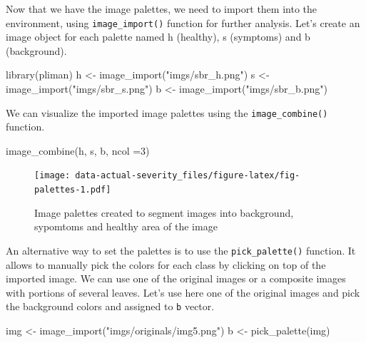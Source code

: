 \documentclass[
  letterpaper,
]{book}
\newenvironment{Shaded}{\begin{snugshade}}{\end{snugshade}}
\newcommand{\AttributeTok}[1]{\textcolor[rgb]{0.40,0.45,0.13}{#1}}
\newcommand{\DecValTok}[1]{\textcolor[rgb]{0.68,0.00,0.00}{#1}}
\newcommand{\FunctionTok}[1]{\textcolor[rgb]{0.28,0.35,0.67}{#1}}
\newcommand{\NormalTok}[1]{\textcolor[rgb]{0.00,0.23,0.31}{#1}}
\newcommand{\OtherTok}[1]{\textcolor[rgb]{0.00,0.23,0.31}{#1}}
\newcommand{\StringTok}[1]{\textcolor[rgb]{0.13,0.47,0.30}{#1}}
\begin{document}
Now that we have the image palettes, we need to import them into the
environment, using \texttt{image\_import()} function for further
analysis. Let's create an image object for each palette named h
(healthy), s (symptoms) and b (background).

\begin{Shaded}
\begin{Highlighting}[]
\FunctionTok{library}\NormalTok{(pliman)}
\NormalTok{h }\OtherTok{\textless{}{-}} \FunctionTok{image\_import}\NormalTok{(}\StringTok{"imgs/sbr\_h.png"}\NormalTok{)}
\NormalTok{s }\OtherTok{\textless{}{-}} \FunctionTok{image\_import}\NormalTok{(}\StringTok{"imgs/sbr\_s.png"}\NormalTok{)}
\NormalTok{b }\OtherTok{\textless{}{-}} \FunctionTok{image\_import}\NormalTok{(}\StringTok{"imgs/sbr\_b.png"}\NormalTok{)}
\end{Highlighting}
\end{Shaded}

We can visualize the imported image palettes using the
\texttt{image\_combine()} function.

\begin{Shaded}
\begin{Highlighting}[]
\FunctionTok{image\_combine}\NormalTok{(h, s, b, }\AttributeTok{ncol =}\DecValTok{3}\NormalTok{)}
\end{Highlighting}
\end{Shaded}

\begin{figure}

{\centering \texttt{[image: data-actual-severity\_files/figure-latex/fig-palettes-1.pdf]}

}

\caption{\label{fig-palettes}Image palettes created to segment images
into background, sypomtoms and healthy area of the image}

\end{figure}

An alternative way to set the palettes is to use the
\texttt{pick\_palette()} function. It allows to manually pick the colors
for each class by clicking on top of the imported image. We can use one
of the original images or a composite images with portions of several
leaves. Let's use here one of the original images and pick the
background colors and assigned to \texttt{b} vector.

\begin{Shaded}
\begin{Highlighting}[]
\NormalTok{img }\OtherTok{\textless{}{-}} \FunctionTok{image\_import}\NormalTok{(}\StringTok{"imgs/originals/img5.png"}\NormalTok{)}
\NormalTok{b }\OtherTok{\textless{}{-}} \FunctionTok{pick\_palette}\NormalTok{(img)}
\end{Highlighting}
\end{Shaded}
\end{document}
